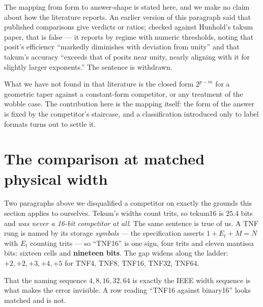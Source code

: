 The mapping from form to answer-shape is stated here, and we make no claim about
how the literature reports. An earlier version of this paragraph said that
published comparisons give verdicts or ratios; checked against Hunhold's takum
paper, that is false --- it reports by regime with numeric thresholds, noting
that posit's efficiency ``markedly diminishes with deviation from unity'' and
that takum's accuracy ``exceeds that of posits near unity, nearly aligning with
it for slightly larger exponents.'' The sentence is withdrawn.

What we have not found in that literature is the closed form $2^{p-m}$ for a
geometric taper against a constant-form competitor, or any treatment of the
wobble case. The contribution here is the mapping itself: the form of the answer
is fixed by the competitor's staircase, and a classification introduced only to
label formats turns out to settle it.




\section{The comparison at matched physical width}\label{sec:matchedwidth}

Two paragraphs above we disqualified a competitor on exactly the grounds this
section applies to ourselves. Tekum's widths count trits, so tekum16 is
$25.4$ bits and \emph{was never a 16-bit competitor at all}. The same sentence
is true of us. A TNF rung is named by its storage \emph{symbols} --- the
specification asserts $1 + E_t + M = N$ with $E_t$ counting trits --- so
``TNF16'' is one sign, four trits and eleven mantissa bits: sixteen cells and
\textbf{nineteen bits}. The gap widens along the ladder: $+2, +2, +3, +4, +5$
for TNF4, TNF8, TNF16, TNF32, TNF64.

That the naming sequence $4, 8, 16, 32, 64$ is exactly the IEEE width sequence
is what makes the error invisible. A row reading ``TNF16 against binary16''
looks matched and is not.

